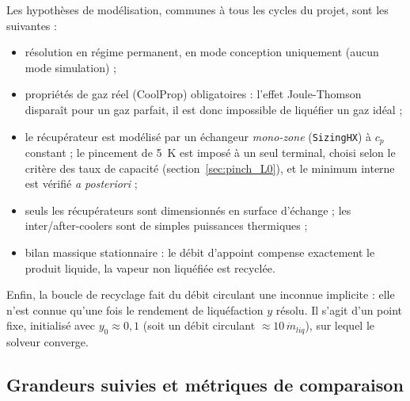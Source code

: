 Les hypothèses de modélisation, communes à tous les cycles du projet, sont
les suivantes :
\begin{itemize}
  \item résolution en régime permanent, en mode conception uniquement (aucun
        mode simulation) ;
  \item propriétés de gaz réel (CoolProp) obligatoires : l'effet
        Joule-Thomson disparaît pour un gaz parfait, il est donc impossible
        de liquéfier un gaz idéal ;
  \item le récupérateur est modélisé par un échangeur \emph{mono-zone}
        (\texttt{SizingHX}) à $c_p$ constant ; le pincement de 5~K est imposé
        à un seul terminal, choisi selon le critère des taux de capacité
        (section~\ref{sec:pinch_L0}), et le minimum interne est vérifié
        \emph{a posteriori} ;
  \item seuls les récupérateurs sont dimensionnés en surface d'échange ; les
        inter/after-coolers sont de simples puissances thermiques ;
  \item bilan massique stationnaire : le débit d'appoint compense
        exactement le produit liquide, la vapeur non liquéfiée est recyclée.
\end{itemize}

Enfin, la boucle de recyclage fait du débit circulant une inconnue
implicite : elle n'est connue qu'une fois le rendement de liquéfaction $y$
résolu. Il s'agit d'un point fixe, initialisé avec $y_0 \approx 0{,}1$
(soit un débit circulant $\approx 10\,\dot m_{liq}$), sur lequel le solveur
converge.

\subsection{Grandeurs suivies et métriques de comparaison}


